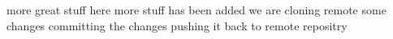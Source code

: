 more great stuff here
more stuff has been added
we are cloning
remote some changes
committing the changes
pushing it back to
remote repositry
